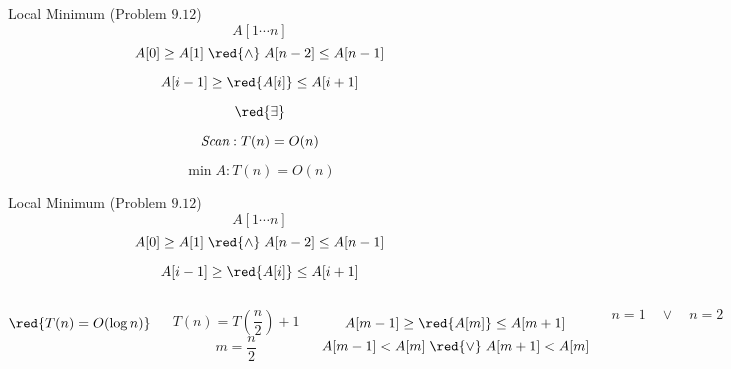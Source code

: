 
\begin{frame}{}
  \begin{exampleblock}{Local Minimum (Problem $9.12$)}
    \[
      A[1 \cdots n]
    \]
    \[
      A[0] \ge A[1] \;\red{\land}\; A[n-2] \le A[n-1]
    \]

    \[
      A[i-1] \ge \red{A[i]} \le A[i+1]
    \]
  \end{exampleblock}

  \pause
  \[
    \red{\exists}
  \]

  \pause
  \[
    \text{\it Scan}: T(n) = O(n)
  \]

  \pause
  \[
    \min A: T(n) = O(n)
  \]
\end{frame}

\begin{frame}{}
  \begin{exampleblock}{Local Minimum (Problem $9.12$)}
    \[
      A[1 \cdots n]
    \]
    \[
      A[0] \ge A[1] \;\red{\land}\; A[n-2] \le A[n-1]
    \]

    \[
      A[i-1] \ge \red{A[i]} \le A[i+1]
    \]
  \end{exampleblock}

  \vspace{0.60cm}
  \begin{columns}
      \pause
      \[
	\red{T(n) = O(\log n)}
      \]

      \pause
      \[
	T(n) = T(\frac{n}{2}) + 1
      \]
      \pause
      \[
	m = \frac{n}{2}
      \]

      \pause
      \[
	A[m-1] \ge \red{A[m]} \le A[m+1]
      \]
      \[
	A[m-1] < A[m] \;\red{\lor}\; A[m+1] < A[m]
      \]

      \pause
      \[
	n = 1 \quad \lor \quad n = 2
      \]
  \end{columns}
\end{frame}
